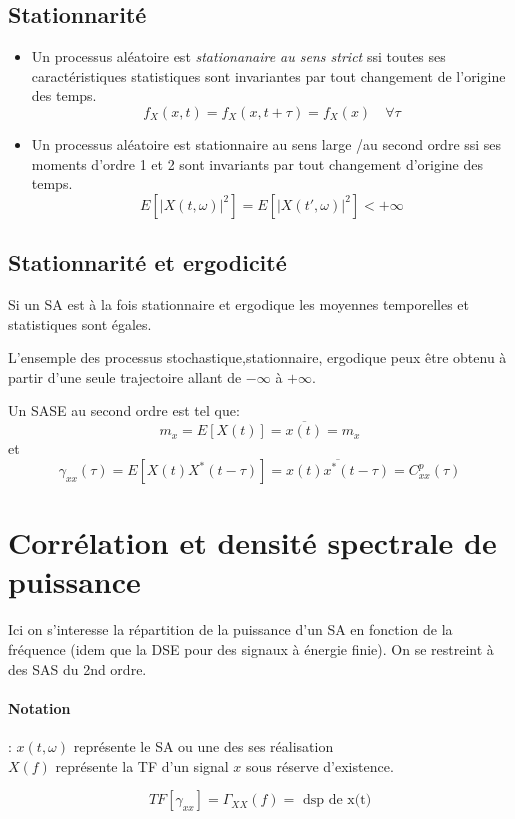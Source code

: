 \documentclass[main.tex]{subfiles}
\begin{document}
\subsection{Stationnarité}
\begin{defin}
  \begin{itemize}
  \item Un processus aléatoire est\emph{ stationanaire au sens strict} ssi
    toutes ses caractéristiques statistiques sont invariantes par tout
    changement de l'origine des temps.
  \[
    f_{X}(x,t) = f_X(x,t+\tau) =f_X(x) \quad \forall \tau 
  \]
\item Un processus aléatoire est stationnaire au sens large /au second ordre ssi ses moments d'ordre 1 et 2 sont invariants par tout changement d'origine des temps.
  \[
    E[|X(t,\omega)|^2] = E[|X(t',\omega)|^2] < +\infty
  \]
\end{itemize}
\end{defin}
\subsection{Stationnarité et ergodicité}
\begin{prop}
  Si  un SA est à la fois stationnaire et ergodique les moyennes temporelles et statistiques sont égales.

  L'ensemple des processus stochastique,stationnaire, ergodique peux être obtenu à partir d'une seule trajectoire allant de $-\infty$ à $+\infty$.
\end{prop}
\begin{prop}
  Un SASE au second ordre est tel que:
  \[
    m_x = E[X(t)]=\overline{x(t)}=m_x
  \]
  et
  \[
    \gamma_{xx}(\tau) = E[X(t)X^{*}(t-\tau)]=\overline{x(t)x^{*}(t-\tau)} = C_{xx}^p(\tau)
  \]
\end{prop}
\section{Corrélation et densité spectrale de puissance}
Ici on s'interesse la répartition de la puissance d'un SA en fonction de la fréquence (idem que la DSE pour des signaux  à énergie finie). On se restreint à des SAS du 2nd ordre.
\paragraph{Notation} :
$x(t,\omega)$ représente le SA ou une des ses réalisation \\
$X(f)$ représente la TF d'un signal $x$ sous réserve d'existence.
\begin{thm}
  \[
    TF[\gamma_{xx}]=\Gamma_{XX}(f) = \text{ dsp de x(t)}
  \]
\end{thm}
\end{document}
